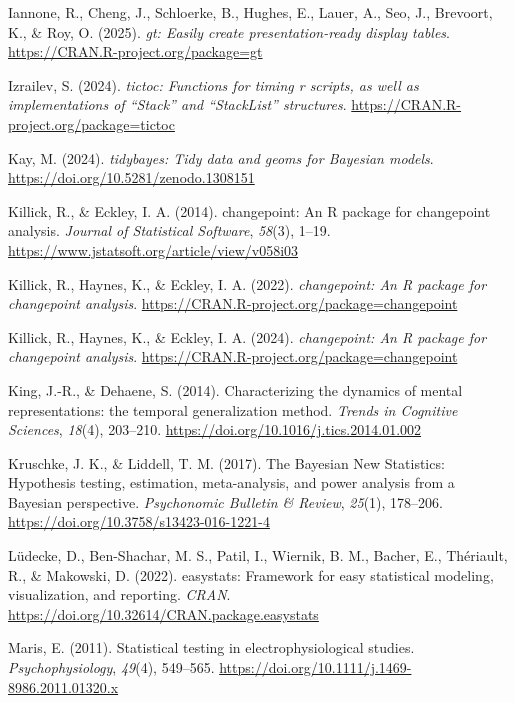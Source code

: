 \documentclass[
  doc,
  floatsintext,
  longtable,
  a4paper,
  nolmodern,
  notxfonts,
  notimes,
  donotrepeattitle,
  colorlinks=true,linkcolor=blue,citecolor=blue,urlcolor=blue]{apa7}
\newlength{\cslhangindent}
\newenvironment{CSLReferences}[2] %
 {\begin{list}{}{%
  \setlength{\itemindent}{0pt}
  \setlength{\leftmargin}{0pt}
  \setlength{\parsep}{0pt}
  \ifodd #1
   \setlength{\leftmargin}{\cslhangindent}
   \setlength{\itemindent}{-1\cslhangindent}
  \fi
  \setlength{\itemsep}{#2\baselineskip}}}
 {\end{list}}
\begin{document}
\begin{CSLReferences}{1}{0}
Iannone, R., Cheng, J., Schloerke, B., Hughes, E., Lauer, A., Seo, J.,
Brevoort, K., \& Roy, O. (2025). \emph{{gt}: Easily create
presentation-ready display tables}.
\url{https://CRAN.R-project.org/package=gt}

Izrailev, S. (2024). \emph{{tictoc}: Functions for timing r scripts, as
well as implementations of {``{Stack}''} and {``{StackList}''}
structures}. \url{https://CRAN.R-project.org/package=tictoc}

Kay, M. (2024). \emph{{tidybayes}: Tidy data and geoms for {Bayesian}
models}. \url{https://doi.org/10.5281/zenodo.1308151}

Killick, R., \& Eckley, I. A. (2014). {changepoint}: An {R} package for
changepoint analysis. \emph{Journal of Statistical Software},
\emph{58}(3), 1--19.
\url{https://www.jstatsoft.org/article/view/v058i03}

Killick, R., Haynes, K., \& Eckley, I. A. (2022). \emph{{changepoint}:
An {R} package for changepoint analysis}.
\url{https://CRAN.R-project.org/package=changepoint}

Killick, R., Haynes, K., \& Eckley, I. A. (2024). \emph{{changepoint}:
An {R} package for changepoint analysis}.
\url{https://CRAN.R-project.org/package=changepoint}

King, J.-R., \& Dehaene, S. (2014). Characterizing the dynamics of
mental representations: the temporal generalization method. \emph{Trends
in Cognitive Sciences}, \emph{18}(4), 203--210.
\url{https://doi.org/10.1016/j.tics.2014.01.002}

Kruschke, J. K., \& Liddell, T. M. (2017). The Bayesian New Statistics:
Hypothesis testing, estimation, meta-analysis, and power analysis from a
Bayesian perspective. \emph{Psychonomic Bulletin \& Review},
\emph{25}(1), 178--206. \url{https://doi.org/10.3758/s13423-016-1221-4}

Lüdecke, D., Ben-Shachar, M. S., Patil, I., Wiernik, B. M., Bacher, E.,
Thériault, R., \& Makowski, D. (2022). {easystats}: Framework for easy
statistical modeling, visualization, and reporting. \emph{CRAN}.
\url{https://doi.org/10.32614/CRAN.package.easystats}

Maris, E. (2011). Statistical testing in electrophysiological studies.
\emph{Psychophysiology}, \emph{49}(4), 549--565.
\url{https://doi.org/10.1111/j.1469-8986.2011.01320.x}


\end{CSLReferences}
\end{document}
